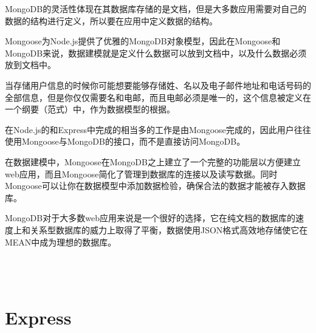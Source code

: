 MongoDB的灵活性体现在其数据库存储的是文档，但是大多数应用需要对自己的数据的结构进行定义，所以要在应用中定义数据的结构。

Mongoose为Node.js提供了优雅的MongoDB对象模型，因此在Mongoose和MongoDB来说，数据建模就是定义什么数据可以放到文档中，以及什么数据必须放到文档中。



当存储用户信息的时候你可能想要能够存储姓、名以及电子邮件地址和电话号码的全部信息，但是你仅仅需要名和电邮，而且电邮必须是唯一的，这个信息被定义在一个纲要（范式）中，作为数据模型的根据。


在Node.js的和Express中完成的相当多的工作是由Mongoose完成的，因此用户往往使用Mongoose与MongoDB的接口，而不是直接访问MongoDB。

在数据建模中，Mongoose在MongoDB之上建立了一个完整的功能层以方便建立web应用，而且Mongoose简化了管理到数据库的连接以及读写数据。同时Mongoose可以让你在数据模型中添加数据检验，确保合法的数据才能被存入数据库。

MongoDB对于大多数web应用来说是一个很好的选择，它在纯文档的数据库的速度上和关系型数据库的威力上取得了平衡，数据使用JSON格式高效地存储使它在MEAN中成为理想的数据库。




\begin{lstlisting}[language=JavaScript]

\end{lstlisting}






\begin{lstlisting}[language=JavaScript]

\end{lstlisting}






\begin{lstlisting}[language=JavaScript]

\end{lstlisting}






\begin{lstlisting}[language=JavaScript]

\end{lstlisting}







\section{Express}

